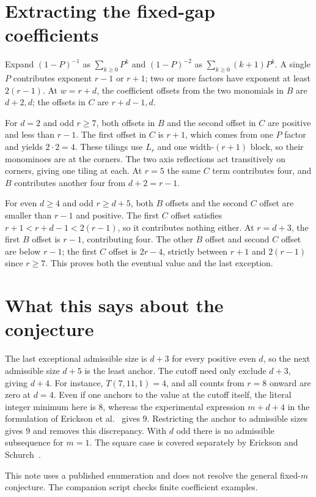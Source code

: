 \documentclass[11pt]{article}
\begin{document}
\section{Extracting the fixed-gap coefficients}
Expand $(1-P)^{-1}$ as $\sum_{k\geq0}P^k$ and $(1-P)^{-2}$ as
$\sum_{k\geq0}(k+1)P^k$. A single $P$ contributes exponent $r-1$ or $r+1$;
two or more factors have exponent at least $2(r-1)$.
At $w=r+d$, the coefficient offsets from the two monomials in $B$ are
$d+2,d$; the offsets in $C$ are $r+d-1,d$.

For $d=2$ and odd $r\geq7$, both offsets in $B$ and the second offset in
$C$ are positive and less than $r-1$. The first offset in $C$ is $r+1$,
which comes from one $P$ factor and yields $2\cdot2=4$. These tilings use
$L_r$ and one width-$(r+1)$ block, so their monominoes are at the corners.
The two axis reflections act transitively on corners, giving one tiling
at each. At $r=5$ the same $C$ term contributes four, and $B$ contributes
another four from $d+2=r-1$.

For even $d\geq4$ and odd $r\geq d+5$, both $B$ offsets and the second
$C$ offset are smaller than $r-1$ and positive. The first $C$ offset
satisfies $r+1<r+d-1<2(r-1)$, so it contributes nothing either.
At $r=d+3$, the first $B$ offset is $r-1$, contributing four. The other
$B$ offset and second $C$ offset are below $r-1$; the first $C$ offset
is $2r-4$, strictly between $r+1$ and $2(r-1)$ since $r\geq7$.
This proves both the eventual value and the last exception.

\section{What this says about the conjecture}
The last exceptional admissible size is $d+3$ for every positive even
$d$, so the next admissible size $d+5$ is the least anchor. The cutoff
need only exclude $d+3$, giving $d+4$. For instance, $T(7,11,1)=4$,
and all counts from $r=8$ onward are zero at $d=4$. Even if one anchors
to the value at the cutoff itself, the literal integer minimum here is
$8$, whereas the experimental expression $m+d+4$ in the formulation of
Erickson et al.~\cite[\S4.1, Conjecture 3]{ersw} gives $9$.
Restricting the anchor to admissible sizes gives $9$ and removes this
discrepancy. With $d$ odd there is no admissible subsequence for $m=1$.
The square case is covered separately by Erickson and Schurch~\cite{es}.

This note uses a published enumeration and does not resolve the general
fixed-$m$ conjecture. The companion script checks finite coefficient examples.
\end{document}

